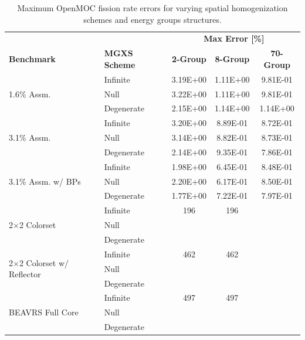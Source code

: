 \begin{table}[h!]
  \centering
  \caption[Maximum OpenMOC fission rate errors]{Maximum OpenMOC fission rate errors for varying spatial homogenization schemes and energy groups structures.}
  \small
  \label{table:chap8-openmoc-max-fiss-rates}
  \vspace{6pt}
  \begin{tabular}{l l c c c}
  \toprule
  \rowcolor{lightgray}
  & & \multicolumn{3}{c}{\cellcolor{lightgray} \textbf{Max Error [\%]}} \\
  \multirow{-2}{*}{\cellcolor{lightgray} \bf Benchmark} &
  \multirow{-2}{*}{\cellcolor{lightgray} \bf \ac{MGXS} Scheme} &
  {\cellcolor{lightgray} \bf 2-Group} &
  {\cellcolor{lightgray} \bf 8-Group} &
  {\cellcolor{lightgray} \bf 70-Group} \\
  \midrule
\multirow{3}{*}{\parbox{2.5cm}{1.6\% Assm.}} & Infinite & 3.19E+00 & 1.11E+00 & 9.81E-01 \\
& Null & 3.22E+00 & 1.11E+00 & 9.81E-01 \\
& Degenerate & 2.15E+00 & 1.14E+00 & 1.14E+00 \\
  \midrule
\multirow{3}{*}{\parbox{2.5cm}{3.1\% Assm.}} & Infinite & 3.20E+00 & 8.89E-01 & 8.72E-01 \\
& Null & 3.14E+00 & 8.82E-01 & 8.73E-01 \\
& Degenerate & 2.14E+00 & 9.35E-01 & 7.86E-01 \\
  \midrule
\multirow{3}{*}{\parbox{2.5cm}{3.1\% Assm. w/ \acp{BP}}} & Infinite & 1.98E+00 & 6.45E-01 & 8.48E-01 \\
& Null & 2.20E+00 & 6.17E-01 & 8.50E-01 \\
& Degenerate & 1.77E+00 & 7.22E-01 & 7.97E-01 \\
  \midrule
  \multirow{3}{*}{\parbox{2.5cm}{2$\times$2 Colorset}} & Infinite & 196 & 196 & \\
  & Null & & & \\
  & Degenerate & & & \\
  \midrule
  \multirow{3}{*}{\parbox{2.3cm}{2$\times$2 Colorset w/ Reflector}} & Infinite & 462 & 462 & \\
  & Null & & & \\
  & Degenerate & & & \\
  \midrule
  \multirow{3}{*}{\parbox{2cm}{\ac{BEAVRS} Full Core}} & Infinite & 497 & 497 & \\
  & Null & & & \\
  & Degenerate & & & \\
  \bottomrule
\end{tabular}
\end{table}

